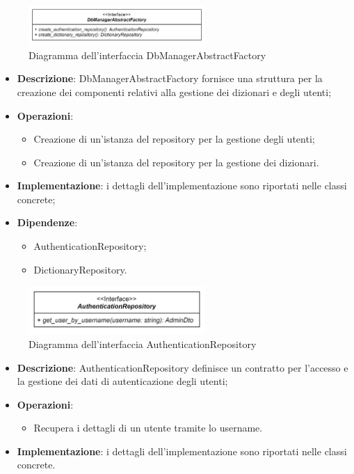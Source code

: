 \label{DbManagerAbstractFactory}
\begin{figure}[H]
    \centering
    \includegraphics[width=0.6\textwidth]{assets/Backend/db_manager_abstract_factory.png}
    \caption{Diagramma dell'interfaccia DbManagerAbstractFactory}
  \end{figure}
\begin{itemize}
    \item \textbf{Descrizione}: DbManagerAbstractFactory fornisce una struttura per la creazione dei componenti relativi alla gestione dei dizionari e degli utenti;
    \item \textbf{Operazioni}:
    \begin{itemize}
      \item Creazione di un'istanza del repository per la gestione degli utenti;
      \item Creazione di un'istanza del repository per la gestione dei dizionari.
    \end{itemize}
    \item \textbf{Implementazione}: i dettagli dell'implementazione sono riportati nelle classi concrete;
    \item \textbf{Dipendenze}:
    \begin{itemize}
      \item AuthenticationRepository;
      \item DictionaryRepository.
    \end{itemize}
\end{itemize} 

 \label{AuthenticationRepository}
\begin{figure}[H]
    \centering
    \includegraphics[width=0.6\textwidth]{assets/Backend/authentication_repository.png}
    \caption{Diagramma dell'interfaccia AuthenticationRepository}
  \end{figure}
\begin{itemize}
    \item \textbf{Descrizione}: AuthenticationRepository definisce un contratto per l'accesso e la gestione dei dati di autenticazione degli utenti;
    \item \textbf{Operazioni}: 
    \begin{itemize}
      \item Recupera i dettagli di un utente tramite lo username.
    \end{itemize}
    \item \textbf{Implementazione}: i dettagli dell'implementazione sono riportati nelle classi concrete.
\end{itemize}

